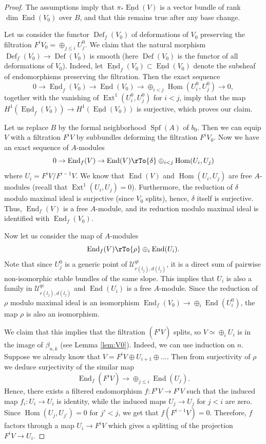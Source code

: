 \documentclass[reqno]{amsart}
\theoremstyle{definition}
\theoremstyle{remark}
\newcommand{\und}{\underline}
\newcommand{\Hom}{\operatorname{Hom}}
\newcommand{\Ext}{\operatorname{Ext}}
\newcommand{\UU}{{\mathcal U}}
\newcommand{\de}{\delta}
\newcommand{\sub}{\subset}
\newcommand{\Def}{\operatorname{Def}}
\newcommand{\Spf}{\operatorname{Spf}}
\newcommand{\End}{\operatorname{End}}
\numberwithin{equation}{section}
\begin{document}
\begin{proof}
The assumptions imply that $\pi_*\und{\End}(V)$ is a vector bundle of rank $\dim \End(V_0)$ over $B$, and that this remains true after any base change.

Let us consider the functor $\Def_f(V_0)$ of deformations of $V_0$ preserving the filtration $F^iV_0=\oplus_{j\le i} U^0_j$. We claim that the natural morphism $\Def_f(V_0)\to \Def(V_0)$
is smooth (here $\Def(V_0)$ is the functor of all deformations of $V_0$). Indeed, let $\und{\End}_f(V_0)\sub \und{\End}(V_0)$ denote the subsheaf of endomorphisms preserving the
filtration. Then the exact sequence
$$0\to \und{\End}_f(V_0)\to \und{\End}(V_0)\to \oplus_{i<j} \und{\Hom}(U^0_i,U^0_j)\to 0,$$
together with the vanishing of $\Ext^1(U^0_i,U^0_j)$ for $i<j$, imply that the map $H^1(\und{\End}_f(V_0))\to H^1(\und{\End}(V_0))$ is surjective, which proves our claim.

Let us replace $B$ by the formal neighborhood $\Spf(A)$ of $b_0$. Then we can equip $V$ with a filtration $F^iV$ by subbundles deforming the filtration $F^iV_0$.
Now we have an exact sequence of $A$-modules
$$0\to \End_f(V)\to \End(V)\rTo{\de} \oplus_{i<j} \Hom(U_i,U_j)$$
where $U_i=F^iV/F^{i-1}V$. We know that $\End(V)$ and $\Hom(U_i,U_j)$ are free $A$-modules (recall that $\Ext^1(U_i,U_j)=0$).
Furthermore, the reduction of $\de$ modulo maximal ideal is surjective (since $V_0$ splits), hence, $\de$ itself is surjective. Thus, $\End_f(V)$ is a free $A$-module, and
its reduction modulo maximal ideal is identified with $\End_f(V_0)$. 

Now let us consider the map of $A$-modules
$$\End_f(V)\rTo{\rho} \oplus_i \End(U_i).$$
Note that since $U^0_j$ is a generic point of $\UU^{qi}_{r(l_j),d(l_j)}$, it is a direct sum of pairwise non-isomorphic stable bundles of the same slope.
This implies that $U_i$ is also a family in $\UU^{qi}_{r(l_j),d(l_j)}$ and $\End(U_i)$ is a free $A$-module.
Since the reduction of $\rho$ modulo maximal ideal is an isomorphism $\End_f(V_0)\to \oplus_i \End(U^0_i)$, the map $\rho$ is also an isomorphism.

We claim that this implies that the filtration $(F^iV)$ splits, so $V\simeq \oplus_i U_i$ is in the image of $\beta_{n,k}$ (see Lemma \ref{lem:V0}). 
Indeed, we can use induction on $n$. Suppose we already know that $V=F^iV\oplus U_{i+1}\oplus\ldots$. Then from surjectivity of $\rho$ we deduce surjectivity of 
the similar map 
$$\End_f(F^iV)\to \oplus_{j\le i} \End(U_j).$$
Hence, there exists a filtered endomorphism $f:F^iV\to F^iV$ such that the induced map $f_i:U_i\to U_i$ is identity, while the induced maps $U_j\to U_j$ for $j<i$ are zero.
Since $\Hom(U_j,U_{j'})=0$ for $j'<j$, we get that $f(F^{i-1}V)=0$. Therefore, $f$ factors through a map $U_i\to F^iV$ which gives a splitting of the projection $F^iV\to U_i$.
\end{proof}
\end{document}
